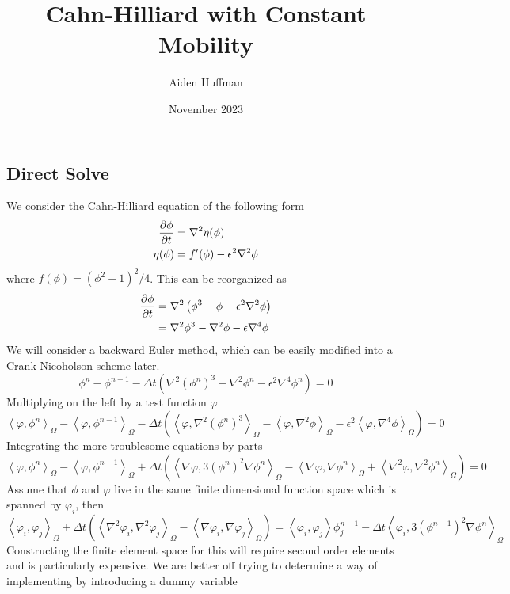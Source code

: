 \documentclass{article}
\title{Cahn-Hilliard with Constant Mobility}
\author{Aiden Huffman}
\date{November 2023}
\newcommand\ang[1]{\left\langle #1 \right\rangle}
\begin{document}
\maketitle

\subsection*{Direct Solve}

We consider the Cahn-Hilliard equation of the following form
\begin{align}
    \diffp{\phi}{t} &= \nabla^2\eta(\phi)\\
    \eta(\phi) &= f'(\phi) - \epsilon^2\nabla^2 \phi
\end{align}
where $f(\phi) = (\phi^2-1)^2/4$. This can be reorganized as
\begin{align}
    \diffp{\phi}{t} &= \nabla^2 \left(
        \phi^3-\phi - \epsilon^2\nabla^2 \phi
    \right)\\
                    &= \nabla^2 \phi^3  - \nabla^2 \phi - \epsilon\nabla^4 \phi
\end{align}
We will consider a backward Euler method, which can be easily modified into a
Crank-Nicoholson scheme later.
\begin{equation}
    \phi^n - \phi^{n-1} - \Delta t\left(
        \nabla^2 (\phi^n)^3  - \nabla^2 \phi^n - \epsilon^2\nabla^4 \phi^n
    \right) = 0
\end{equation}
Multiplying on the left by a test function $\varphi$
\begin{equation}
    \ang{\varphi,\phi^n}_\Omega - \ang{\varphi, \phi^{n-1}}_{\Omega}
    - \Delta t \left(
        \ang{\varphi, \nabla^2(\phi^n)^3}_\Omega 
        - \ang{\varphi, \nabla^2 \phi}_\Omega
        - \epsilon^2\ang{\varphi,\nabla^4\phi}_\Omega
    \right) = 0
\end{equation}
Integrating the more troublesome equations by parts
\begin{equation}
    \ang{\varphi,\phi^n}_\Omega - \ang{\varphi,\phi^{n-1}}_\Omega
    + \Delta t \left(
        \ang{\nabla\varphi, 3(\phi^n)^2\nabla\phi^n}_\Omega
        - \ang{\nabla\varphi, \nabla\phi^n}_\Omega
        + \ang{\nabla^2\varphi, \nabla^2\phi^n}_\Omega
    \right) = 0 
\end{equation}
Assume that $\phi$ and $\varphi$ live in the same finite dimensional function
space which is spanned by $\varphi_i$, then
\begin{equation}
    \ang{\varphi_i, \varphi_j}_\Omega + \Delta t\left(
        \ang{\nabla^2 \varphi_i,\nabla^2\varphi_j}_\Omega
        - \ang{\nabla \varphi_i,\nabla\varphi_j}_\Omega
    \right) = \ang{\varphi_i, \varphi_j}\phi^{n-1}_j
    - \Delta t\ang{\varphi_i, 3(\phi^{n-1})^2\nabla \phi^n}_\Omega
\end{equation}
Constructing the finite element space for this will require second order
elements and is particularly expensive. We are better off trying to determine a
way of implementing by introducing a dummy variable
\end{document}
